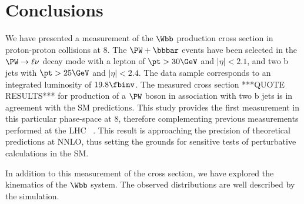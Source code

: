 \section{Conclusions}\label{Conclusions}



We have presented a measurement of the $\Wbb$ production
cross section in proton-proton collisions at 8\TeV. The $\PW+\bbbar$ events
have been  selected in the $\PW \to \ell\nu$ decay mode with a
lepton of $\pt>30\GeV$ and $|\eta|<2.1$, and two b jets with $\pt>25\GeV$ and $|\eta|<2.4$.
The data sample corresponds to an integrated luminosity of $19.8\fbinv$.
The measured cross section ***QUOTE RESULTS***
for production of a $\PW$ boson in association with two b jets is in agreement with
the SM predictions.
This study provides the first measurement in this particular phase-space at 8\TeV,
therefore complementing previous measurements performed at the LHC ~\cite{Aad:2011kp}.
This result is approaching the precision of theoretical predictions at NNLO,
thus setting the grounds for sensitive tests of perturbative calculations in the SM.

In addition to this measurement of the cross section, we have explored the kinematics of the $\Wbb$ system.
The observed distributions are well described by the simulation.


